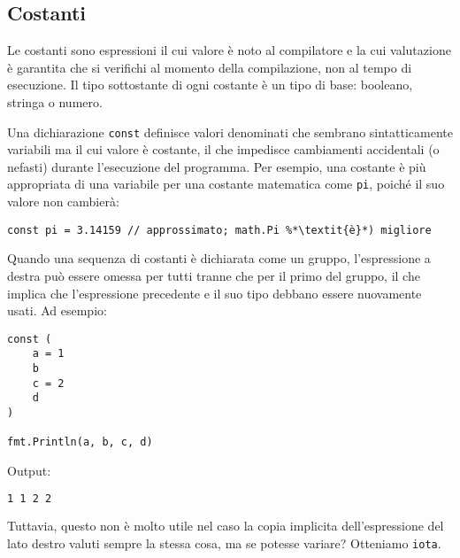 \documentclass[../../thesis.tex]{subfiles}
\begin{document}
    \subsection{Costanti}\label{subsec:costanti}
    Le costanti sono espressioni il cui valore è noto al compilatore e la cui valutazione è garantita che si verifichi al momento della compilazione, non al tempo di esecuzione.
    Il tipo sottostante di ogni costante è un tipo di base: booleano, stringa o numero.
    \hfill \vspace{12pt}

    Una dichiarazione \verb"const" definisce valori denominati che sembrano sintatticamente variabili ma il cui valore è costante, il che impedisce cambiamenti accidentali (o nefasti) durante l'esecuzione del programma.
    Per esempio, una costante è più appropriata di una variabile per una costante matematica come \verb"pi", poiché il suo valore non cambierà:
    \begin{lstlisting}[frame = single, label = {lst:lstlisting2-3.1}]
const pi = 3.14159 // approssimato; math.Pi %*\textit{è}*) migliore
    \end{lstlisting}
    Quando una sequenza di costanti è dichiarata come un gruppo, l'espressione a destra può essere omessa per tutti tranne che per il primo del gruppo, il che implica che l'espressione precedente e il suo tipo debbano essere nuovamente usati.
    Ad esempio:
    \begin{lstlisting}[frame = single, label = {lst:lstlisting2-3.2}]
const (
    a = 1
    b
    c = 2
    d
)

fmt.Println(a, b, c, d)
    \end{lstlisting}
    Output:
    \begin{lstlisting}[language = bash, frame = L, label = {lst:lstlisting2-3.3}]
1 1 2 2
    \end{lstlisting}
    Tuttavia, questo non è molto utile nel caso la copia implicita dell'espressione del lato destro valuti sempre la stessa cosa, ma se potesse variare?
    Otteniamo \verb"iota".
    
\end{document}

